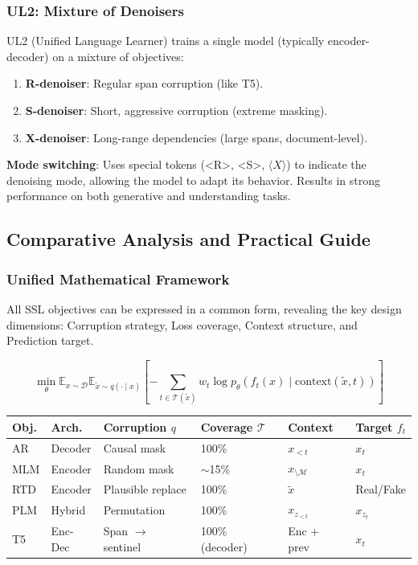 \documentclass{article}
\begin{document}
\subsubsection{UL2: Mixture of Denoisers}

UL2 (Unified Language Learner) trains a single model (typically encoder-decoder) on a mixture of objectives:

\begin{enumerate}
\item \textbf{R-denoiser}: Regular span corruption (like T5).
\item \textbf{S-denoiser}: Short, aggressive corruption (extreme masking).
\item \textbf{X-denoiser}: Long-range dependencies (large spans, document-level).
\end{enumerate}

\textbf{Mode switching}: Uses special tokens (<R>, <S>, $\langle X \rangle$) to indicate the denoising mode, allowing the model to adapt its behavior. Results in strong performance on both generative and understanding tasks.

\subsection{Comparative Analysis and Practical Guide}

\subsubsection{Unified Mathematical Framework}

All SSL objectives can be expressed in a common form, revealing the key design dimensions: Corruption strategy, Loss coverage, Context structure, and Prediction target.

\begin{equation}
\min_\theta \mathbb{E}_{x \sim \mathcal{D}} \mathbb{E}_{\tilde{x} \sim q(\cdot \mid x)} \left[ -\sum_{t \in \mathcal{T}(\tilde{x})} w_t \log p_\theta(f_t(x) \mid \text{context}(\tilde{x}, t)) \right]
\end{equation}

\begin{center}
\begin{tabular}{@{}llllll@{}}
\toprule
\textbf{Obj.} & \textbf{Arch.} & \textbf{Corruption} $q$ & \textbf{Coverage} $\mathcal{T}$ & \textbf{Context} & \textbf{Target} $f_t$ \\
\midrule
AR & Decoder & Causal mask & 100\% & $x_{<t}$ & $x_t$ \\
MLM & Encoder & Random mask & $\sim$15\% & $x_{\setminus \mathcal{M}}$ & $x_t$ \\
RTD & Encoder & Plausible replace & 100\% & $\tilde{x}$ & Real/Fake \\
PLM & Hybrid & Permutation & 100\% & $x_{z_{<t}}$ & $x_{z_t}$ \\
T5 & Enc-Dec & Span $\rightarrow$ sentinel & 100\% (decoder) & Enc + prev & $x_t$ \\
\bottomrule
\end{tabular}
\end{center}
\end{document}
